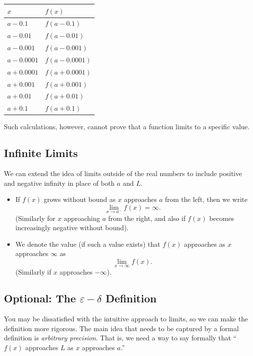 \documentclass{article}
\theoremstyle{definition}
\theoremstyle{definition}
\begin{document}
\begin{center}
\begin{tabular}{@{}ll@{}}
\toprule[0.4mm]
   $x$        & $f(x)$        \\
\midrule
   $a-0.1$    & $f(a-0.1)$    \\
   $a-0.01$   & $f(a-0.01)$   \\
   $a-0.001$  & $f(a-0.001)$  \\
   $a-0.0001$ & $f(a-0.0001)$ \\
\midrule
   $a+0.0001$ & $f(a+0.0001)$ \\
   $a+0.001$  & $f(a+0.001)$  \\
   $a+0.01$   & $f(a+0.01)$   \\
   $a+0.1$    & $f(a+0.1)$    \\
\bottomrule[0.4mm]
\end{tabular}
\end{center}

Such calculations, however, cannot prove that a function limits to a specific value.

\subsection{Infinite Limits}

We can extend the idea of limits outside of the real numbers to include positive and negative infinity in place of both $a$ and $L$.
\begin{itemize}
\item If $f(x)$ grows without bound as $x$ approaches $a$ from the left, then we write $$\lim_{x\to a^-}f(x)=\infty.$$
(Similarly for $x$ approaching $a$ from the right, and also if $f(x)$ becomes increasingly negative without bound).
\item We denote the value (if such a value exists) that $f(x)$ approaches as $x$ approaches $\infty$ as $$\lim_{x\to\infty} f(x).$$
(Similarly if $x$ approaches $-\infty$).
\end{itemize}



\subsection{Optional: The $\varepsilon-\delta$ Definition}

You may be dissatisfied with the intuitive approach to limits, so we can make the definition more rigorous. The main idea that needs to be captured by a formal definition is \textit{arbitrary precision}. That is, we need a way to say formally that ``$f(x)$ approaches $L$ as $x$ approaches $a$.''
\end{document}
